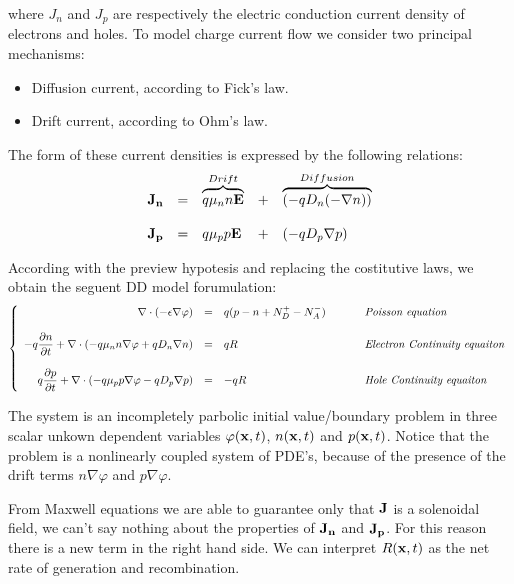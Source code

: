 where $J_n$ and $J_p$ are respectively the electric conduction current density of electrons and holes.
To model charge current flow we consider two principal mechanisms:
\begin{itemize}
\item Diffusion current, according to Fick's law.
\item Drift current, according to Ohm's law.
\end{itemize}
The form of these current densities is expressed by the following relations:
\begin{equation}
\begin{array}{rclcl}
\mathbf{J_n} & = & \overbrace{q\mu_n n \mathbf{E}}^{Drift} &+& \overbrace{(- qD_n(- \nabla n))}^{Diffusion} \\ \\
\mathbf{J_p} & = & q\mu_p p \mathbf{E} &+& (-qD_p \nabla p) 
\end{array}
\end{equation}



 According with the preview hypotesis and replacing the costitutive laws, we obtain the seguent DD model forumulation:
\begin{equation}
\label{eq: full problem}
\left\{
\begin{array}{rcll}
\nabla \cdot (-\epsilon \nabla \varphi) & = & q(p-n+N_D^+-N_A^-)  &\psp{15} \textit{Poisson equation}\\ \\
-q\dfrac{\partial n}{\partial t} + \nabla \cdot ( - q\mu_n n \nabla \varphi + qD_n \nabla n )& = & qR &\psp{15} \textit{Electron Continuity equaiton}\\ \\
q\dfrac{\partial p}{\partial t} + \nabla \cdot (- q\mu_p p \nabla \varphi - qD_p \nabla p )& = & -qR &\psp{15} \textit{Hole Continuity equaiton}
\end{array}
\right.
\end{equation}

The system is an incompletely parbolic initial value/boundary problem in three scalar unkown dependent variables $\varphi(\mathbf{x},t)$, $n(\mathbf{x},t)$ and $p(\mathbf{x},t)$. Notice that the problem is a nonlinearly coupled system of PDE's, because of the presence of the drift terms $n\nabla \varphi$ and $p \nabla 	\varphi$. 

From Maxwell equations we are able to guarantee only that $\mathbf{J}$ is a solenoidal field, we can't say nothing about the properties of $\mathbf{J_n}$ and $\mathbf{J_p}$. For this reason there is a new term in the right hand side. We can interpret $R(\mathbf{x},t)$ as the net rate of generation and recombination.

